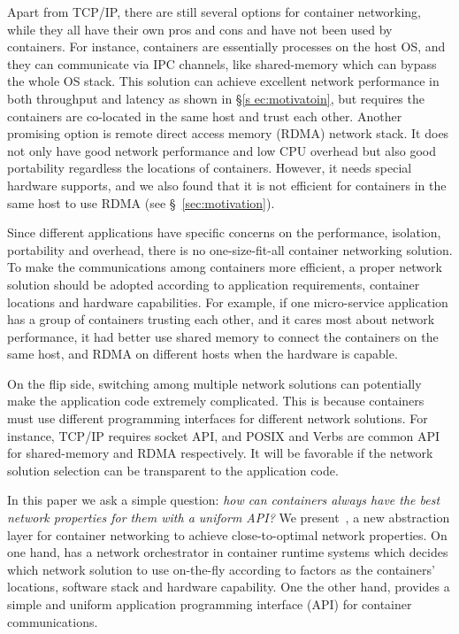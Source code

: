 Apart from TCP/IP, there are still several options for container networking,
while they all have their own pros and cons and have not been used by containers.
For instance, containers are essentially processes on the host OS, and they can 
communicate via IPC channels, like shared-memory which can bypass the whole OS 
stack. This solution can achieve
excellent network performance in both throughput and latency as shown in \S\ref{s
ec:motivatoin}, but requires the containers are co-located in the same host and 
trust each other. Another promising option is remote direct access memory (RDMA) network stack. It does not only have good network performance and low CPU overhead but also good portability regardless the locations of containers. 
However, it needs special hardware supports, and we also found that it is not efficient for containers in the same host to use RDMA
(see \S~\ref{sec:motivation}). 

Since different applications have specific concerns on the performance, 
isolation, portability and overhead, there is no
one-size-fit-all container networking solution. To make the communications among
containers more efficient, a proper network solution should be adopted according
to application requirements, container locations and hardware capabilities.
For example, if one micro-service application has a group of containers trusting each other, and it cares most about network performance, it had better use
shared memory to connect the containers on the same host, and RDMA on different hosts when the hardware is capable. 

On the flip side, switching among multiple network solutions can potentially 
make the application code extremely complicated. This is because
containers must use different programming interfaces for different
network solutions. For instance, TCP/IP requires socket API, and POSIX and Verbs
are common API for shared-memory and RDMA respectively. 
It will be favorable if the network solution selection can be transparent to the application code.

In this paper we ask a simple question: {\em how can containers always have the best network properties for them with a uniform API?}
We present~\sysname, a new abstraction layer for container networking to achieve close-to-optimal network properties. 
On one hand, \sysname has a network orchestrator in container runtime systems which decides which network solution to use on-the-fly according to factors as the containers' locations, software stack and hardware capability. One the other hand, \sysname provides a simple and uniform application programming interface (API) for container communications.   


